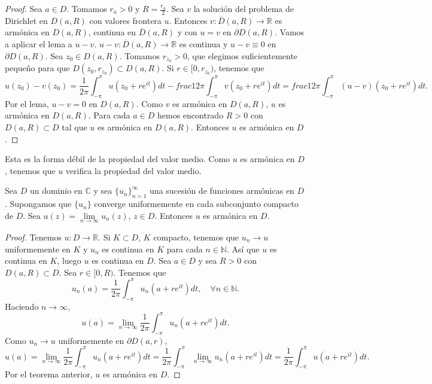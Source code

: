 \begin{proof}
    Sea $a \in D$.
    Tomamos $r_a > 0$ y $R = \frac{r_a}{2}$.
    Sea $v$ la solución del problema de Dirichlet en $D(a, R)$ con valores frontera $u$.
    Entonces $v: \overline{D}(a, R) \to \mathbb{R}$ es armónica en $D(a, R)$, continua en $\overline{D}(a, R)$ y con $u = v$ en $\partial D(a, R)$.
    Vamos a aplicar el lema a $u-v$.
    $u-v: \overline{D}(a, R) \to \mathbb{R}$ es continua y $u-v \equiv 0$ en $\partial D(a, R)$.
    Sea $z_0 \in D(a, R)$.
    Tomamos $r_{z_0} > 0$, que elegimos suficientemente pequeño para que $D(z_0, r_{z_0}) \subset D(a, R)$.
    Si $r \in [0, r_{z_0})$, tenemos que
    $$u(z_0)-v(z_0) = \frac{1}{2\pi} \int_{-\pi}^\pi u(z_0 + re^{it})dt - frac{1}{2\pi} \int_{-\pi}^\pi v(z_0 + re^{it})dt = frac{1}{2\pi} \int_{-\pi}^\pi (u-v)(z_0 + re^{it})dt.$$
    Por el lema, $u-v = 0$ en $D(a, R)$.
    Como $v$ es armónica en $D(a, R)$, $u$ es armónica en $D(a, R)$.
    Para cada $a \in D$ hemos encontrado $R > 0$ con $D(a, R) \subset D$ tal que $u$ es armónica en $D(a, R)$.
    Entonces $u$ es armónica en $D$.
\end{proof}

\begin{remark}
    Esta es la forma débil de la propiedad del valor medio.
    Como $u$ es armónica en $D$, tenemos que $u$ verifica la propiedad del valor medio.
\end{remark}

\begin{theorem}
    Sea $D$ un dominio en $\mathbb{C}$ y sea $\{u_n\}_{n=1}^\infty$ una sucesión de funciones armónicas en $D$.
    Supongamos que $\{u_n\}$ converge uniformemente en cada subconjunto compacto de $D$.
    Sea $u(z) = \lim\limits_{n \to \infty} u_n(z)$, $z \in D$.
    Entonces $u$ es armónica en $D$.
\end{theorem}

\begin{proof}
    Tenemos $u: D \to \mathbb{R}$.
    Si $K \subset D$, $K$ compacto, tenemos que $u_n \to u$ uniformemente en $K$ y $u_n$ es continua en $K$ para cada $n \in \mathbb{N}$.
    Así que $u$ es continua en $K$, luego $u$ es continua en $D$.
    Sea $a \in D$ y sea $R > 0$ con $D(a, R) \subset D$.
    Sea $r \in [0, R)$.
    Tenemos que
    $$u_n(a) = \frac{1}{2\pi} \int_{-\pi}^\pi u_n(a + re^{it})dt, \quad \forall n \in \mathbb{N}.$$
    Haciendo $n \to \infty$,
    $$u(a) = \lim_{n \to \infty} \frac{1}{2\pi} \int_{-\pi}^\pi u_n(a + re^{it})dt.$$
    Como $u_n \to u$ uniformemente en $\partial D(a, r)$,
    $$u(a) = \lim_{n \to \infty} \frac{1}{2\pi} \int_{-\pi}^\pi u_n(a + re^{it})dt = \frac{1}{2\pi} \int_{-\pi}^\pi \lim_{n \to \infty} u_n(a + re^{it})dt = \frac{1}{2\pi} \int_{-\pi}^\pi u(a + re^{it})dt.$$
    Por el teorema anterior, $u$ es armónica en $D$.
\end{proof}

